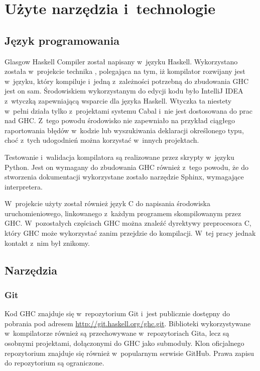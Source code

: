 \chapter{Użyte narzędzia i~technologie}\label{chap:technologie}

\section{Język programowania}\label{sec:jezyk_programowania}

Glasgow Haskell Compiler został napisany w~języku Haskell. Wykorzystano została
w~projekcie technika , polegająca na tym, iż kompilator
rozwijany jest w~języku, który kompiluje i~jedną z~zależności potrzebną do
zbudowania GHC jest on sam. Środowiskiem wykorzystanym do edycji kodu było
IntelliJ IDEA z~wtyczką zapewniającą wsparcie dla języka Haskell. Wtyczka ta
niestety w~pełni działa tylko z~projektami systemu Cabal i~nie jest dostosowana
do prac nad GHC. Z~tego powodu środowisko nie zapewniało na przykład ciągłego
raportowania błędów w~kodzie lub wyszukiwania deklaracji określonego typu, choć
z~tych udogodnień można korzystać w~innych projektach.

Testowanie i~walidacja kompilatora są realizowane przez skrypty w~języku
Python. Jest on wymagany do zbudowania GHC
również z~tego powodu, że do stworzenia dokumentacji wykorzystane zostało
narzędzie Sphinx, wymagające interpretera.

W~projekcie użyty został również język C do napisania środowiska
uruchomieniowego, linkowanego z~każdym programem skompilowanym przez GHC.
W~pozostałych częściach GHC można znaleźć dyrektywy preprocesora C, który GHC może
wykorzystać zanim przejdzie do kompilacji. W~tej pracy jednak kontakt z~nim był
znikomy.

\section{Narzędzia}

\subsection{Git}

Kod GHC znajduje się w~repozytorium Git i~jest publicznie dostępny do
pobrania pod adresem \url{http://git.haskell.org/ghc.git}.
Biblioteki wykorzystywane w~kompilatorze również są przechowywane
w~repozytoriach Gita, lecz są osobnymi projektami, dołączonymi do GHC jako
submoduły. Klon oficjalnego repozytorium znajduje się również w~popularnym
serwisie GitHub. Prawa zapisu do repozytorium są
ograniczone\cite{WikiGettingTheSources}.

